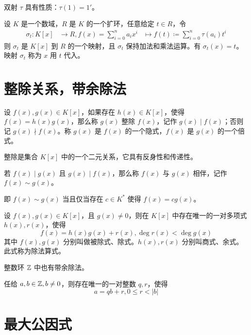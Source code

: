双射 $\tau$ 具有性质：$\tau(1) = 1'$。

\begin{theorem}
    设 $K$ 是一个数域，$R$ 是 $K$ 的一个扩环，任意给定 $t\in R$，令
    \begin{equation*}
        \begin{aligned}
            \sigma_t : K[x] & \to R, f(x) = \sum_{i=0}^n a_ix^i & \mapsto f(t) \coloneqq  \sum_{i=0}^n \tau(a_i)t^i
        \end{aligned}
    \end{equation*}
    则 $\sigma_t$ 是 $K[x]$ 到 $R$ 的一个映射，且 $\sigma_t$ 保持加法和乘法运算。有 $\sigma_t(x) = t$。映射 $\sigma_t$ 称为 $x$ 用 $t$ 代入。
\end{theorem}

\section{整除关系，带余除法}

设 $f(x), g(x) \in K[x]$，如果存在 $h(x) \in K[x]$，使得 $f(x) = h(x)g(x)$，那么称 $g(x)$ 整除 $f(x)$，记作 $g(x) \mid f(x)$；否则记 $g(x) \nmid f(x)$。称 $g(x)$ 是 $f(x)$ 的一个隐式，$f(x)$ 是 $g(x)$ 的一个倍式。

整除是集合 $K[x]$ 中的一个二元关系，它具有反身性和传递性。

\begin{definition}
    若 $f(x) \mid g(x)$ 且 $g(x) \mid f(x)$，那么称 $f(x)$ 与 $g(x)$ 相伴，记作 $f(x) \sim g(x)$。
\end{definition}

即 $f(x) \sim g(x)$ 当且仅当存在 $c \in K^*$ 使得 $f(x) = cg(x)$。

\begin{definition}[带余除法]
    设 $f(x), g(x) \in K[x]$，且 $g(x) \ne 0$，则在 $K[x]$ 中存在唯一的一对多项式 $h(x), r(x)$，使得
    \[f(x) = h(x)g(x) + r(x), \deg r(x) < \deg g(x)\]
    其中 $f(x), g(x)$ 分别叫做被除式、除式。$h(x),r(x)$ 分别叫商式、余式。此式称为除法算式。
\end{definition}

整数环 $\mathbb{Z}$ 中也有带余除法。

\begin{theorem}
    任给 $a,b\in \mathbb{Z}, b\ne 0$，则存在唯一的一对整数 $q,r$，使得
    \[a = qb + r, 0 \leqslant r < |b|\]
\end{theorem}

\section{最大公因式}

